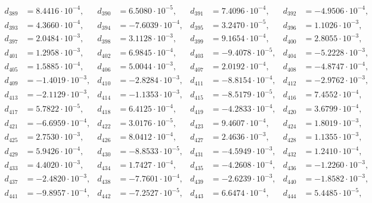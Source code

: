 \begin{align*}
d_{ 389 } &= 8.4416 \cdot 10^{ -4 }, & d_{ 390 } &= 6.5080 \cdot 10^{ -5 }, & d_{ 391 } &= 7.4096 \cdot 10^{ -4 }, & d_{ 392 } &= -4.9506 \cdot 10^{ -4 },\\ 
d_{ 393 } &= 4.3660 \cdot 10^{ -4 }, & d_{ 394 } &= -7.6039 \cdot 10^{ -4 }, & d_{ 395 } &= 3.2470 \cdot 10^{ -5 }, & d_{ 396 } &= 1.1026 \cdot 10^{ -3 },\\ 
d_{ 397 } &= 2.0484 \cdot 10^{ -3 }, & d_{ 398 } &= 3.1128 \cdot 10^{ -3 }, & d_{ 399 } &= 9.1654 \cdot 10^{ -4 }, & d_{ 400 } &= 2.8055 \cdot 10^{ -3 },\\ 
d_{ 401 } &= 1.2958 \cdot 10^{ -3 }, & d_{ 402 } &= 6.9845 \cdot 10^{ -4 }, & d_{ 403 } &= -9.4078 \cdot 10^{ -5 }, & d_{ 404 } &= -5.2228 \cdot 10^{ -3 },\\ 
d_{ 405 } &= 1.5885 \cdot 10^{ -4 }, & d_{ 406 } &= 5.0044 \cdot 10^{ -3 }, & d_{ 407 } &= 2.0192 \cdot 10^{ -4 }, & d_{ 408 } &= -4.8747 \cdot 10^{ -4 },\\ 
d_{ 409 } &= -1.4019 \cdot 10^{ -3 }, & d_{ 410 } &= -2.8284 \cdot 10^{ -3 }, & d_{ 411 } &= -8.8154 \cdot 10^{ -4 }, & d_{ 412 } &= -2.9762 \cdot 10^{ -3 },\\ 
d_{ 413 } &= -2.1129 \cdot 10^{ -3 }, & d_{ 414 } &= -1.1353 \cdot 10^{ -3 }, & d_{ 415 } &= -8.5179 \cdot 10^{ -5 }, & d_{ 416 } &= 7.4552 \cdot 10^{ -4 },\\ 
d_{ 417 } &= 5.7822 \cdot 10^{ -5 }, & d_{ 418 } &= 6.4125 \cdot 10^{ -4 }, & d_{ 419 } &= -4.2833 \cdot 10^{ -4 }, & d_{ 420 } &= 3.6799 \cdot 10^{ -4 },\\ 
d_{ 421 } &= -6.6959 \cdot 10^{ -4 }, & d_{ 422 } &= 3.0176 \cdot 10^{ -5 }, & d_{ 423 } &= 9.4607 \cdot 10^{ -4 }, & d_{ 424 } &= 1.8019 \cdot 10^{ -3 },\\ 
d_{ 425 } &= 2.7530 \cdot 10^{ -3 }, & d_{ 426 } &= 8.0412 \cdot 10^{ -4 }, & d_{ 427 } &= 2.4636 \cdot 10^{ -3 }, & d_{ 428 } &= 1.1355 \cdot 10^{ -3 },\\ 
d_{ 429 } &= 5.9426 \cdot 10^{ -4 }, & d_{ 430 } &= -8.8533 \cdot 10^{ -5 }, & d_{ 431 } &= -4.5949 \cdot 10^{ -3 }, & d_{ 432 } &= 1.2410 \cdot 10^{ -4 },\\ 
d_{ 433 } &= 4.4020 \cdot 10^{ -3 }, & d_{ 434 } &= 1.7427 \cdot 10^{ -4 }, & d_{ 435 } &= -4.2608 \cdot 10^{ -4 }, & d_{ 436 } &= -1.2260 \cdot 10^{ -3 },\\ 
d_{ 437 } &= -2.4820 \cdot 10^{ -3 }, & d_{ 438 } &= -7.7601 \cdot 10^{ -4 }, & d_{ 439 } &= -2.6239 \cdot 10^{ -3 }, & d_{ 440 } &= -1.8582 \cdot 10^{ -3 },\\ 
d_{ 441 } &= -9.8957 \cdot 10^{ -4 }, & d_{ 442 } &= -7.2527 \cdot 10^{ -5 }, & d_{ 443 } &= 6.6474 \cdot 10^{ -4 }, & d_{ 444 } &= 5.4485 \cdot 10^{ -5 },\\ 

\end{align*}

